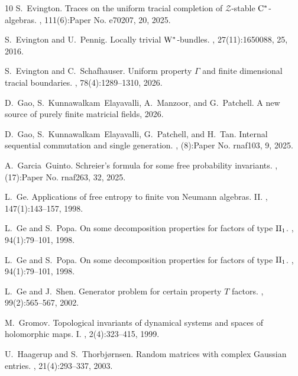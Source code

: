 \documentclass[10pt]{amsart}
\theoremstyle{definition}
\numberwithin{equation}{section}
\begin{document}
\begin{thebibliography}{10}
S.~Evington.
\newblock Traces on the uniform tracial completion of {$\mathcal{Z}$}-stable {$\rm {C}^*$}-algebras.
, 111(6):Paper No. e70207, 20, 2025.

S.~Evington and U.~Pennig.
\newblock Locally trivial {${\rm W}^*$}-bundles.
, 27(11):1650088, 25, 2016.

S.~Evington and C.~Schafhauser.
\newblock Uniform property {$\Gamma$} and finite dimensional tracial boundaries.
, 78(4):1289--1310, 2026.

D.~Gao, S.~Kunnawalkam~Elayavalli, A.~Manzoor, and G.~Patchell.
\newblock A new source of purely finite matricial fields, 2026.

D.~Gao, S.~Kunnawalkam~Elayavalli, G.~Patchell, and H.~Tan.
\newblock Internal sequential commutation and single generation.
, (8):Paper No. rnaf103, 9, 2025.

A.~Garcia~Guinto.
\newblock Schreier's formula for some free probability invariants.
, (17):Paper No. rnaf263, 32, 2025.

L.~Ge.
\newblock Applications of free entropy to finite von {N}eumann algebras. {II}.
, 147(1):143--157, 1998.

L.~Ge and S.~Popa.
\newblock On some decomposition properties for factors of type {${\rm II}_1$}.
, 94(1):79--101, 1998.

L.~Ge and S.~Popa.
\newblock On some decomposition properties for factors of type {${\rm II}_1$}.
, 94(1):79--101, 1998.

L.~Ge and J.~Shen.
\newblock Generator problem for certain property {$T$} factors.
, 99(2):565--567, 2002.

M.~Gromov.
\newblock Topological invariants of dynamical systems and spaces of holomorphic maps. {I}.
, 2(4):323--415, 1999.

U.~Haagerup and S.~Thorbj{\o}rnsen.
\newblock Random matrices with complex {G}aussian entries.
, 21(4):293--337, 2003.


\end{thebibliography}
\end{document}
